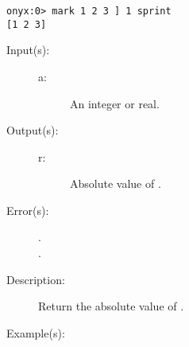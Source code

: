 \begin{description}
\begin{description}
\begin{verbatim}
onyx:0> mark 1 2 3 ] 1 sprint
[1 2 3]
		\end{verbatim}
	\end{description}
\label{systemdict:abs}
\item[{\onyxop{a}{abs}{r}}: ]
	\begin{description}\item[]
	\item[Input(s): ]
		\begin{description}\item[]
		\item[a: ]
			An integer or real.
		\end{description}
	\item[Output(s): ]
		\begin{description}\item[]
		\item[r: ]
			Absolute value of .
		\end{description}
	\item[Error(s): ]
		\begin{description}\item[]
		\item[.]
		\item[.]
		\end{description}
	\item[Description: ]
		Return the absolute value of .
	\item[Example(s): ]\begin{verbatim}


\end{verbatim}
\end{description}
\end{description}
